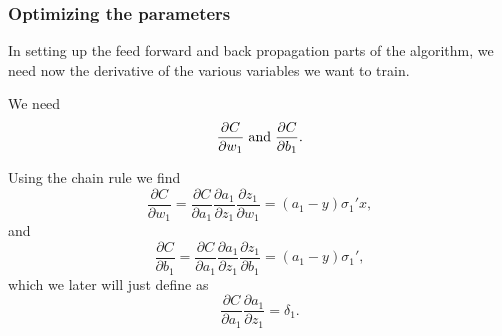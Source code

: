 \documentclass{beamer}
\begin{document}
\begin{frame}
\frametitle{Optimizing the parameters}

In setting up the feed forward and back propagation parts of the
algorithm, we need now the derivative of the various variables we want
to train.

We need
\[
\frac{\partial C}{\partial w_1} \hspace{0.1cm}\mathrm{and}\hspace{0.1cm}\frac{\partial C}{\partial b_1}. 
\]

Using the chain rule we find 
\[
\frac{\partial C}{\partial w_1}=\frac{\partial C}{\partial a_1}\frac{\partial a_1}{\partial z_1}\frac{\partial z_1}{\partial w_1}=(a_1-y)\sigma_1'x,
\]
and
\[
\frac{\partial C}{\partial b_1}=\frac{\partial C}{\partial a_1}\frac{\partial a_1}{\partial z_1}\frac{\partial z_1}{\partial b_1}=(a_1-y)\sigma_1',
\]
which we later will just define as
\[
\frac{\partial C}{\partial a_1}\frac{\partial a_1}{\partial z_1}=\delta_1.
\]
\end{frame}
\end{document}
